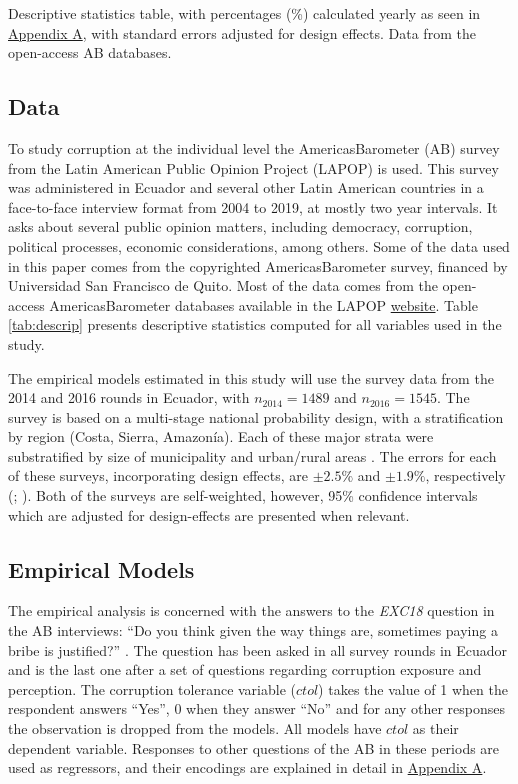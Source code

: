 \documentclass[floatsintext,man]{apa7}\usepackage[]{graphicx}\usepackage[]{color}
\begin{document}
\vspace{-1cm}
\noindent Descriptive statistics table, with percentages (\%) calculated yearly as seen in \hyperref[app:first]{Appendix A}, with standard errors adjusted for design effects. Data from the open-access AB databases.
\clearpage
\subsection{Data}
To study corruption at the individual level the AmericasBarometer (AB) survey from the Latin American Public Opinion Project (LAPOP) is used. This survey was administered in Ecuador and several other Latin American countries in a face-to-face interview format from 2004 to 2019, at mostly two year intervals. It asks about several public opinion matters, including democracy, corruption, political processes, economic considerations, among others. Some of the data used in this paper comes from the copyrighted \textregistered AmericasBarometer survey, financed by Universidad San Francisco de Quito. Most of the data comes from the open-access AmericasBarometer databases available in the LAPOP \href{https://www.vanderbilt.edu/lapop/data-access.php}{website}. Table \ref{tab:descrip} presents descriptive statistics computed for all variables used in the study. 

The empirical models estimated in this study will use the survey data from the 2014 and 2016 rounds in Ecuador, with $n_{2014}=1489$ and $n_{2016}= 1545$. The survey is based on a multi-stage national probability design, with a stratification by region (Costa, Sierra, Amazonía). Each of these major strata were substratified by size of municipality and urban/rural areas \parencite{LAPOP.2017}. The errors for each of these surveys, incorporating design effects, are $\pm 2.5\%$ and $\pm 1.9\%$, respectively (\cite{LAPOP.2014}; \cite{LAPOP.2017}). Both of the surveys are self-weighted, however, 95\% confidence intervals which are adjusted for design-effects are presented when relevant. 

\subsection{Empirical Models}
The empirical analysis is concerned with the answers to the \emph{EXC18} question in the AB interviews: 
\enquote{Do you think given the way things are, sometimes paying a bribe is justified?} \parencite[p.96]{Moscoso.2018}. The question has been asked in all survey rounds in Ecuador and is the last one after a set of questions regarding corruption exposure and perception. The corruption tolerance variable ($ctol$) takes the value of 1 when the respondent answers \enquote{Yes}, 0 when they answer \enquote{No} and for any other responses the observation is dropped from the models. All models have $ctol$ as their dependent variable. Responses to other questions of the AB in these periods are used as regressors, and their encodings are explained in detail in \href{app:first}{Appendix A}. 
\end{document}
